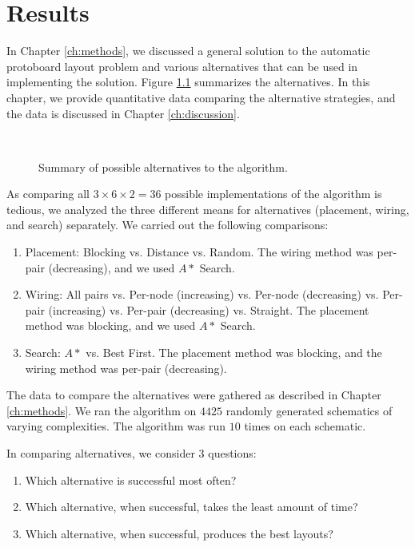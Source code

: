 
\chapter{Results}
\label{ch:results}

In Chapter \ref{ch:methods}, we discussed a general solution to the automatic
protoboard
layout problem and various alternatives that can be used in implementing the
solution. Figure \ref{fig:alternatives} summarizes the alternatives.
In this chapter, we provide quantitative data comparing the alternative
strategies, and the data is discussed in Chapter \ref{ch:discussion}.

\begin{figure}[H]
\centering
{}
\\
\caption[Algorithm alternatives summary]{Summary of possible alternatives
to the algorithm.}
\label{fig:alternatives}
\end{figure}

As comparing all $3 \times 6 \times 2 = 36$ possible implementations of the
algorithm is tedious,
we analyzed the three different means for alternatives (placement, wiring, and
search) separately. We carried out the following comparisons:

\begin{enumerate}
\item Placement: Blocking vs. Distance vs. Random. The wiring method was per-pair
(decreasing), and we used $A*$ Search.
\item Wiring: All pairs vs. Per-node (increasing) vs. Per-node (decreasing) vs.
Per-pair (increasing) vs. Per-pair (decreasing) vs. Straight.
The placement method was blocking, and we used $A*$ Search.
\item Search: $A*$ vs. Best First. The placement method was blocking, and the
wiring method was per-pair (decreasing).
\end{enumerate}

The data to compare the alternatives were gathered as described in Chapter
\ref{ch:methods}. We ran the algorithm on $4425$ randomly generated schematics
of varying complexities. The algorithm was run $10$ times on each schematic.

In comparing alternatives, we consider $3$ questions:
\begin{enumerate}
\item Which alternative is successful most often?
\item Which alternative, when successful, takes the least amount of time?
\item Which alternative, when successful, produces the best layouts?
\end{enumerate}


